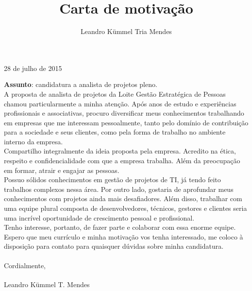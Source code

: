 \documentclass[a4paper,10pt]{article}
\title{Carta de motivação}
\author{Leandro Kümmel Tria Mendes}
\begin{document}
\begin{flushright} 
28 de julho de 2015
\end{flushright}
\textbf{Assunto}: candidatura a analista de projetos pleno.\\

   A proposta de analista de projetos da Loite Gestão Estratégica de Pessoas chamou particularmente a minha atenção. Após anos de estudo e
experiências profissionais e associativas, procuro diversificar meus conhecimentos trabalhando em empresas que me interessam pessoalmente, 
tanto pelo domínio de contribuição para a sociedade e seus clientes, 
como pela forma de trabalho no ambiente interno da empresa.\\

Compartilho integralmente da ideia proposta pela empresa. Acredito na
ética, respeito e confidencialidade com que a empresa trabalha.
Além da preocupação em formar, atrair e engajar as pessoas.\\

Possuo sólidos conhecimentos em gestão de projetos de TI, já tendo feito trabalhos complexos 
nessa área. Por outro lado, gostaria de aprofundar meus conhecimentos com projetos ainda mais desafiadores.
Além disso, trabalhar com uma equipe plural composta de
desenvolvedores, técnicos, gestores e clientes seria uma incrível oportunidade
de crescimento pessoal e profissional.\\

Tenho interesse, portanto, de fazer parte e colaborar com essa enorme equipe.
Espero que meu currículo e minha motivação vos tenha interessado, me
coloco à disposição para contato para quaisquer dúvidas sobre minha
candidatura.\\
\\
Cordialmente,\\
\\
Leandro Kümmel T. Mendes
\end{document}

